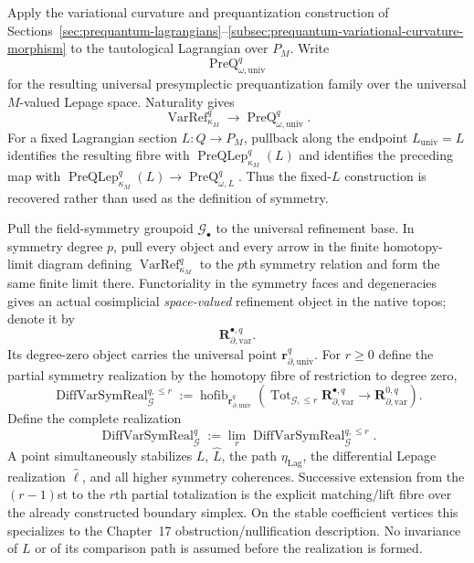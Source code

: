 Apply the variational curvature and prequantization construction of
Sections~\ref{sec:prequantum-lagrangians}--\ref{subsec:prequantum-variational-curvature-morphism}
to the tautological Lagrangian over $P_M$.  Write
\[
\operatorname{PreQ}_{\omega,\mathrm{univ}}^q
\]
for the resulting universal presymplectic prequantization family over the
universal $M$-valued Lepage space.  Naturality gives
\[
\boxed{
\operatorname{VarRef}_{\kappa_M}^q
\longrightarrow
\operatorname{PreQ}_{\omega,\mathrm{univ}}^q.
}
\]
For a fixed Lagrangian section $L:Q\to P_M$, pullback along the endpoint
$L_{\mathrm{univ}}=L$ identifies the resulting fibre with
$\operatorname{PreQLep}_{\kappa_M}^q(L)$ and identifies the preceding map with
$\operatorname{PreQLep}_{\kappa_M}^q(L)\to\operatorname{PreQ}_{\omega,L}^q$.
Thus the fixed-$L$ construction is recovered rather than used as the definition
of symmetry.

\begin{construction}
\label{constr:prequantum-differential-lagrangian-stabilizer}
Pull the field-symmetry groupoid $\mathcal G_\bullet$ to the universal refinement
base.  In symmetry degree $p$, pull every object and every arrow in the finite
homotopy-limit diagram defining $\operatorname{VarRef}_{\kappa_M}^q$ to the
$p$th symmetry relation and form the same finite limit there.  Functoriality in
the symmetry faces and degeneracies gives an actual cosimplicial
\emph{space-valued} refinement object in the native topos; denote it by
\[
\mathbf R_{\partial,\mathrm{var}}^{\bullet,q}.
\]
Its degree-zero object carries the universal point
$\mathbf r_{\partial,\mathrm{univ}}^q$.  For $r\ge0$ define the partial symmetry
realization by the homotopy fibre of restriction to degree zero,
\[
\operatorname{DiffVarSymReal}^{q,\le r}_{\mathcal G}
:=
\operatorname{hofib}_{\mathbf r_{\partial,\mathrm{univ}}^q}
\left(
\operatorname{Tot}_{\mathcal G,\le r}
\mathbf R_{\partial,\mathrm{var}}^{\bullet,q}
\longrightarrow
\mathbf R_{\partial,\mathrm{var}}^{0,q}
\right).
\]
Define the complete realization
\[
\boxed{
\operatorname{DiffVarSymReal}^{q}_{\mathcal G}
:=
\lim_r
\operatorname{DiffVarSymReal}^{q,\le r}_{\mathcal G}.
}
\]
A point simultaneously stabilizes
$L$, $\widehat L$, the path $\eta_{\mathrm{Lag}}$, the differential Lepage
realization $\widehat\ell$, and all higher symmetry coherences.  Successive
extension from the $(r-1)$st to the $r$th partial totalization is the explicit
matching/lift fibre over the already constructed boundary simplex.  On the
stable coefficient vertices this specializes to the Chapter~17
obstruction/nullification description.  No invariance of $L$ or of its
comparison path is assumed before the realization is formed.
\end{construction}

